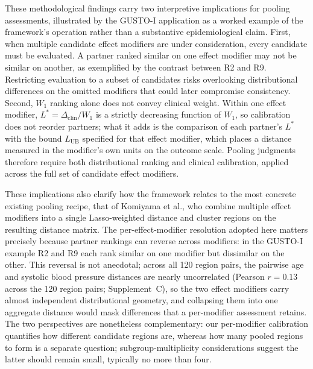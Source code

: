 \documentclass[AMA,Times1COL]{WileyNJDv5}
\begin{document}
These methodological findings carry two interpretive implications for pooling assessments, illustrated by the GUSTO-I application as a worked example of the framework's operation rather than a substantive epidemiological claim. First, when multiple candidate effect modifiers are under consideration, every candidate must be evaluated. A partner ranked similar on one effect modifier may not be similar on another, as exemplified by the contrast between R2 and R9. Restricting evaluation to a subset of candidates risks overlooking distributional differences on the omitted modifiers that could later compromise consistency. Second, $W_1$ ranking alone does not convey clinical weight. Within one effect modifier, $L^* = \Delta_{\text{clin}} / W_1$ is a strictly decreasing function of $W_1$, so calibration does not reorder partners; what it adds is the comparison of each partner's $L^*$ with the bound $L_{\text{UB}}$ specified for that effect modifier, which places a distance measured in the modifier's own units on the outcome scale. Pooling judgments therefore require both distributional ranking and clinical calibration, applied across the full set of candidate effect modifiers.

These implications also clarify how the framework relates to the most concrete existing pooling recipe, that of Komiyama et al., who combine multiple effect modifiers into a single Lasso-weighted distance and cluster regions on the resulting distance matrix.\cite{komiyama2024} The per-effect-modifier resolution adopted here matters precisely because partner rankings can reverse across modifiers: in the GUSTO-I example R2 and R9 each rank similar on one modifier but dissimilar on the other. This reversal is not anecdotal; across all 120 region pairs, the pairwise age and systolic blood pressure distances are nearly uncorrelated (Pearson $r = 0.13$ across the 120 region pairs; Supplement~C), so the two effect modifiers carry almost independent distributional geometry, and collapsing them into one aggregate distance would mask differences that a per-modifier assessment retains. The two perspectives are nonetheless complementary: our per-modifier calibration quantifies how different candidate regions are, whereas how many pooled regions to form is a separate question; subgroup-multiplicity considerations suggest the latter should remain small, typically no more than four.\cite{komiyama2024,quan2010}
\end{document}
